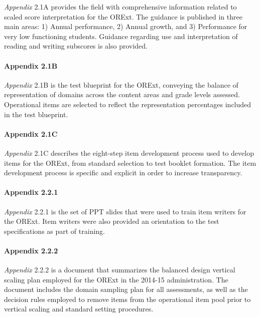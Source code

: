 \documentclass[]{article}
\let\oldparagraph\paragraph
\renewcommand{\paragraph}[1]{\oldparagraph{#1}\mbox{}}
\begin{document}
\emph{Appendix} 2.1A provides the field with comprehensive information
related to scaled score interpretation for the ORExt. The guidance is
published in three main areas: 1) Annual performance, 2) Annual growth,
and 3) Performance for very low functioning students. Guidance regarding
use and interpretation of reading and writing subscores is also
provided.

\paragraph{Appendix 2.1B}\label{appendix-2.1b}

\emph{Appendix} 2.1B is the test blueprint for the ORExt, conveying the
balance of representation of domains across the content areas and grade
levels assessed. Operational items are selected to reflect the
representation percentages included in the test blueprint.

\paragraph{Appendix 2.1C}\label{appendix-2.1c}

\emph{Appendix} 2.1C describes the eight-step item development process
used to develop items for the ORExt, from standard selection to test
booklet formation. The item development process is specific and explicit
in order to increase transparency.

\paragraph{Appendix 2.2.1}\label{appendix-2.2.1}

\emph{Appendix} 2.2.1 is the set of PPT slides that were used to train
item writers for the ORExt. Item writers were also provided an
orientation to the test specifications as part of training.

\paragraph{Appendix 2.2.2}\label{appendix-2.2.2}

\emph{Appendix} 2.2.2 is a document that summarizes the balanced design
vertical scaling plan employed for the ORExt in the 2014-15
administration. The document includes the domain sampling plan for all
assessments, as well as the decision rules employed to remove items from
the operational item pool prior to vertical scaling and standard setting
procedures.
\end{document}
